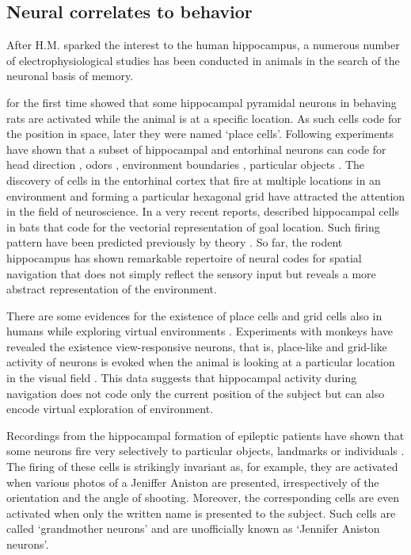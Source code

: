     
  \subsection{Neural correlates to behavior} 
    After H.M. sparked the interest to the human hippocampus, a numerous
    number of electrophysiological studies has been conducted in animals in the
    search of the neuronal basis of memory.

    \cite{OKeefe1971} for the first time showed that some hippocampal pyramidal
    neurons in behaving rats are activated while the animal is at a specific
    location. As such cells code for the position in space, later they were
    named `place cells'. Following experiments have shown that a subset of
    hippocampal and entorhinal neurons can code for head direction
    \citep{Taube1990a, Taube1990b}, odors \citep{Wood1999}, environment
    boundaries \citep{Barry2006}, particular objects \citep{Manns2009}. The
    discovery of cells in the entorhinal cortex that fire at multiple locations
    in an environment and forming a particular hexagonal grid
    \citep{Hafting2005} have attracted the attention in the field of
    neuroscience. In a very recent reports, \cite{Sarel2017} described
    hippocampal cells in bats that code for the vectorial representation of
    goal location. Such firing pattern have been predicted previously by theory
    \citep{Stemmler2015}. So far, the rodent hippocampus has shown remarkable
    repertoire of neural codes for spatial navigation that does not simply
    reflect the sensory input but reveals a more abstract representation of the
    environment.
  
    There are some evidences for the existence of place cells and grid cells
    also in humans while exploring virtual environments \citep{Ekstrom2003,
    Jacobs2013}. Experiments with monkeys have revealed the existence
    view-responsive neurons, that is, place-like and grid-like activity of
    neurons is evoked when the animal is looking at a particular location in
    the visual field \citep{Rolls1995, Killian2012}. This data suggests that
    hippocampal activity during navigation does not code only the current
    position of the subject but can also encode virtual exploration of
    environment.
    
    Recordings from the hippocampal formation of epileptic patients have shown
    that some neurons fire very selectively to particular objects, landmarks or
    individuals \citep{Quiroga2005}. The firing of these cells is strikingly
    invariant as, for example, they are activated when various photos of a
    Jeniffer Aniston are presented, irrespectively of the orientation and the
    angle of shooting. Moreover, the corresponding cells are even activated
    when only the written name is presented to the subject. Such cells are
    called `grandmother neurons' and are unofficially known as `Jennifer
    Aniston neurons'.

